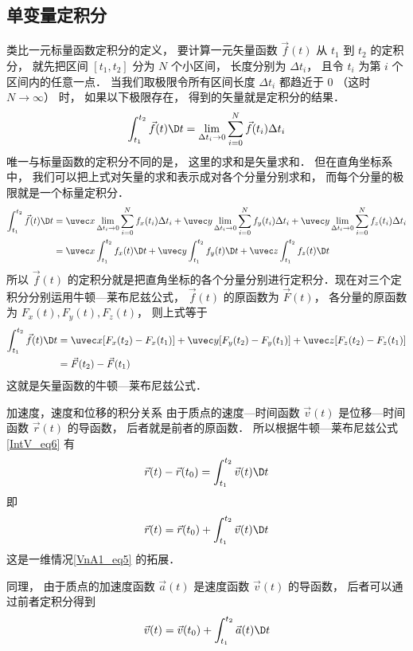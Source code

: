 \subsection{单变量定积分}
类比一元标量函数定积分的定义， 要计算一元矢量函数 $\vec f(t)$ 从 $t_1$ 到 $t_2$ 的定积分， 就先把区间 $[t_1, t_2]$ 分为 $N$ 个小区间， 长度分别为 $\Delta t_i$， 且令 $t_i$ 为第 $i$ 个区间内的任意一点． 当我们取极限令所有区间长度 $\Delta t_i$ 都趋近于 $0$ （这时 $N\to\infty$） 时， 如果以下极限存在， 得到的矢量就是定积分的结果．
\begin{equation}
\int_{t_1}^{t_2} \vec f(t) \D t = \lim_{\Delta t_i \to 0} \sum_{i = 0}^N \vec f(t_i) \Delta t_i
\end{equation}
唯一与标量函数的定积分不同的是， 这里的求和是矢量求和． 但在直角坐标系中， 我们可以把上式对矢量的求和表示成对各个分量分别求和， 而每个分量的极限就是一个标量定积分． 
\begin{equation}\begin{aligned}
\int_{t_1}^{t_2} \vec f(t) \D t &= \uvec x\lim_{\Delta t_i \to 0} \sum_{i = 0}^N f_x(t_i) \Delta t_i
+ \uvec y\lim_{\Delta t_i \to 0} \sum_{i = 0}^N f_y(t_i) \Delta t_i
+ \uvec y\lim_{\Delta t_i \to 0} \sum_{i = 0}^N f_z(t_i) \Delta t_i\\
&= \uvec x\int_{t_1}^{t_2} f_x(t) \D t + \uvec y\int_{t_1}^{t_2} f_y(t) \D t + \uvec z\int_{t_1}^{t_2} f_z(t) \D t
\end{aligned}\end{equation}
所以 $\vec f(t)$ 的定积分就是把直角坐标的各个分量分别进行定积分．现在对三个定积分分别运用牛顿—莱布尼兹公式， $\vec f(t)$ 的原函数为 $\vec F(t)$， 各分量的原函数为 $F_x(t), F_y(t), F_z(t)$， 则上式等于
\begin{equation}\begin{aligned}\label{IntV_eq6}
\int_{t_1}^{t_2} \vec f(t) \D t &= \uvec x [F_x(t_2) - F_x(t_1)] + \uvec y [F_y(t_2) - F_y(t_1)] + \uvec z [F_z(t_2) - F_z(t_1)]\\
&= \vec F(t_2) - \vec F(t_1)
\end{aligned}\end{equation}
这就是矢量函数的牛顿—莱布尼兹公式．

\begin{exam}{加速度，速度和位移的积分关系}\label{IntV_ex1}
由于质点的速度—时间函数 $\vec v(t)$ 是位移—时间函数 $\vec r(t)$ 的导函数， 后者就是前者的原函数． 所以根据牛顿—莱布尼兹公式\autoref{IntV_eq6} 有
\begin{equation}
\vec r(t) - \vec r(t_0) = \int_{t_1}^{t_2} \vec v(t) \D t
\end{equation}
即
\begin{equation}
\vec r(t) = \vec r(t_0) + \int_{t_1}^{t_2} \vec v(t) \D t
\end{equation}
这是一维情况\autoref{VnA1_eq5} 的拓展．

同理， 由于质点的加速度函数 $\vec a(t)$ 是速度函数 $\vec v(t)$ 的导函数， 后者可以通过前者定积分得到
\begin{equation}
\vec v(t) = \vec v(t_0) + \int_{t_1}^{t_2} \vec a(t) \D t
\end{equation}
\end{exam}


